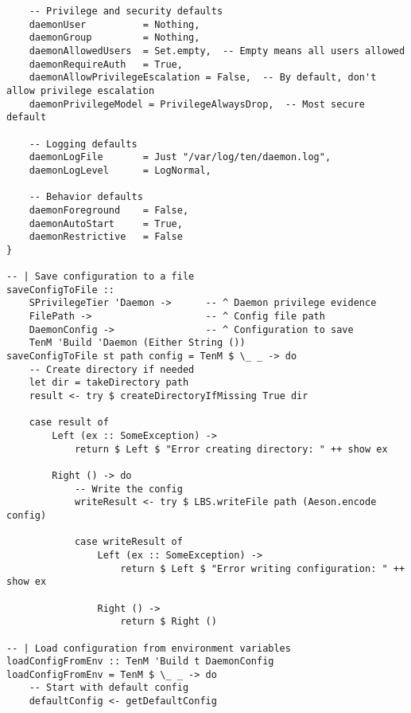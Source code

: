 \documentclass{article}
\begin{document}
\begin{tcolorbox}[title=Ten/Daemon/Config.hs Changes]
\begin{verbatim}
    -- Privilege and security defaults
    daemonUser          = Nothing,
    daemonGroup         = Nothing,
    daemonAllowedUsers  = Set.empty,  -- Empty means all users allowed
    daemonRequireAuth   = True,
    daemonAllowPrivilegeEscalation = False,  -- By default, don't allow privilege escalation
    daemonPrivilegeModel = PrivilegeAlwaysDrop,  -- Most secure default

    -- Logging defaults
    daemonLogFile       = Just "/var/log/ten/daemon.log",
    daemonLogLevel      = LogNormal,

    -- Behavior defaults
    daemonForeground    = False,
    daemonAutoStart     = True,
    daemonRestrictive   = False
}

-- | Save configuration to a file
saveConfigToFile ::
    SPrivilegeTier 'Daemon ->      -- ^ Daemon privilege evidence
    FilePath ->                    -- ^ Config file path
    DaemonConfig ->                -- ^ Configuration to save
    TenM 'Build 'Daemon (Either String ())
saveConfigToFile st path config = TenM $ \_ _ -> do
    -- Create directory if needed
    let dir = takeDirectory path
    result <- try $ createDirectoryIfMissing True dir

    case result of
        Left (ex :: SomeException) ->
            return $ Left $ "Error creating directory: " ++ show ex

        Right () -> do
            -- Write the config
            writeResult <- try $ LBS.writeFile path (Aeson.encode config)

            case writeResult of
                Left (ex :: SomeException) ->
                    return $ Left $ "Error writing configuration: " ++ show ex

                Right () ->
                    return $ Right ()

-- | Load configuration from environment variables
loadConfigFromEnv :: TenM 'Build t DaemonConfig
loadConfigFromEnv = TenM $ \_ _ -> do
    -- Start with default config
    defaultConfig <- getDefaultConfig


\end{verbatim}
\end{tcolorbox}
\end{document}
